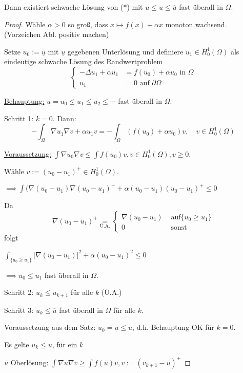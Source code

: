 Dann existiert schwache Lösung von ($\ast$) mit $\underline u \leq u \leq \overline u$ fast überall in $\Omega$.

\begin{proof}
  Wähle $\alpha > 0$ so groß, dass $x \mapsto f(x) + \alpha x$ monoton wachsend. (Vorzeichen Abl. positiv machen)

  Setze $u_0 := \underline u$ mit $\underline u$ gegebenen Unterlösung und definiere $u_1 \in H_0^1(\Omega)$ als eindeutige schwache Lösung des Randwertproblem
  $$
  \begin{cases}
    -\Delta u_1 + \alpha u_1 &= f(u_0) + \alpha u_0 \text{ in } \Omega \\
    u_1 &= 0 \text{ auf } \partial \Omega
  \end{cases}
  $$

  \underline{Behauptung:} $\underline u = u_0 \leq u_1 \leq u_2 \leq \cdots $ fast überall in $\Omega$.

  Schritt 1: $k = 0$. Dann:
  $$
  - \int_\Omega \nabla u_1 \nabla v + \alpha u_1 v = - \int_\Omega(f(u_0) + \alpha u_0) v, \quad v \in H_0^1(\Omega)
  $$

  \underline{Voraussetzung:} $\int \nabla u_0 \nabla v \leq \int f(u_0) v, v \in H_0^1(\Omega), v \geq 0$.

  Wähle $v := (u_0 - u_1)^+ \in H_0^1(\Omega)$.

  $\implies \int(\nabla (u_0 - u_1) \nabla (u_0 - u_1)^+ + \alpha (u_0 - u_1)(u_0 - u_1)^+ \leq 0$

  Da $$\nabla(u_0 - u_1)^+ \underset{\text{Ü.A.}}{=} \begin{cases} \nabla(u_0 - u_1) & \text{ auf} \{u_0 \geq u_1\} \\ 0 & \text{ sonst}\end{cases}$$ folgt

  $\int_{\{u_0 \geq u_1\}} |\nabla(u_0 - u_1)|^2 + \alpha(u_0 - u_1)^2 \leq 0$

  $\implies u_0 \leq u_1$ fast überall in $\Omega$.

  Schritt 2: $u_k \leq u_{k + 1}$ für alle $k$ (Ü.A.)

  Schritt 3: $u_k \leq \overline u$ fast überall in $\Omega$ für alle $k$.

  Voraussetzung aus dem Satz: $u_0 = \underline u \leq \overline u$, d.h. Behauptung OK für $k = 0$.

  Es gelte $u_k \leq \overline u$, für ein $k$

  $\overline u$ Oberlösung: $\int \nabla \overline u \nabla v \geq \int f(\overline u) v, v := (v_{k + 1} - \overline u)^+$


\end{proof}
